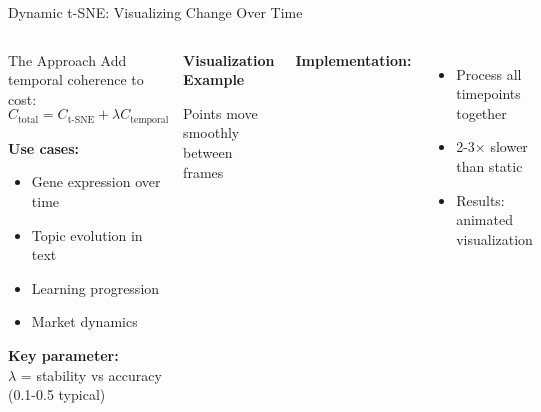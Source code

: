 \documentclass[aspectratio=169]{beamer}
\begin{document}
\begin{frame}{Dynamic t-SNE: Visualizing Change Over Time}
\begin{columns}
\begin{block}{The Approach}
Add temporal coherence to cost:
$$C_{\text{total}} = C_{\text{t-SNE}} + \lambda C_{\text{temporal}}$$

\textbf{Use cases:}
\begin{itemize}
\item Gene expression over time
\item Topic evolution in text
\item Learning progression
\item Market dynamics
\end{itemize}

\textbf{Key parameter:}\\
$\lambda$ = stability vs accuracy\\
\small (0.1-0.5 typical)
\end{block}

\begin{center}
\textbf{Visualization Example}\\[3mm]

Points move smoothly between frames
\end{center}

\textbf{Implementation:}
\begin{itemize}
\item Process all timepoints together
\item 2-3× slower than static
\item Results: animated visualization
\end{itemize}
\end{columns}
\end{frame}
\end{document}
